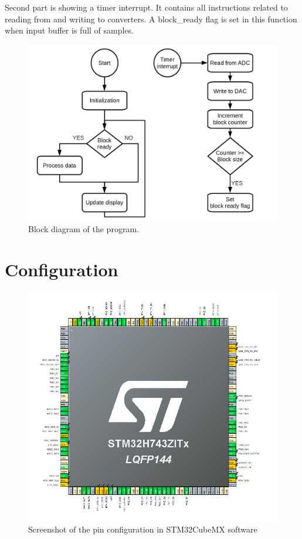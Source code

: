 \documentclass[a4paper,twoside,12pt]{book}
\begin{document}
Second part is showing a timer interrupt.
It contains all instructions related
to reading from and writing to converters.
A block\_ready flag is set in this function
when input buffer is full of samples.

\begin{figure}[H]
    \centering
    \includegraphics[width=\textwidth]{images/Block2}
    \caption{Block diagram of the program.}
    \label{fig:block2}
\end{figure}

\section{Configuration}

\begin{figure}[H]
    \centering
    \includegraphics[width=\textwidth]{images/pin_overview}
    \caption{Screenshot of the pin configuration in STM32CubeMX software}
    \label{fig:pins}
\end{figure}
\end{document}
